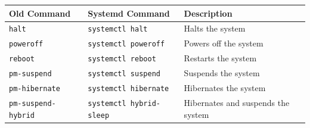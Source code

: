 \documentclass[a4paper]{article}
\begin{document}
\begin{center}
\vspace{6mm}

\begin{tabularx}{\textwidth}{ |X|X|X| }
\hline
\rowcolor[gray]{.8}
\bfseries Old Command & \bfseries Systemd Command  & \bfseries Description \\\hline
\tt halt              & \tt systemctl halt         & Halts the system \\\hline
\tt poweroff          & \tt systemctl poweroff     & Powers off the system \\\hline
\tt reboot            & \tt systemctl reboot       & Restarts the system \\\hline
\tt pm-suspend        & \tt systemctl suspend      & Suspends the system \\\hline
\tt pm-hibernate      & \tt systemctl hibernate    & Hibernates the system \\\hline
\tt pm-suspend-hybrid & \tt systemctl hybrid-sleep & Hibernates and suspends the system \\\hline
\end{tabularx}

\end{center}
\end{document}

